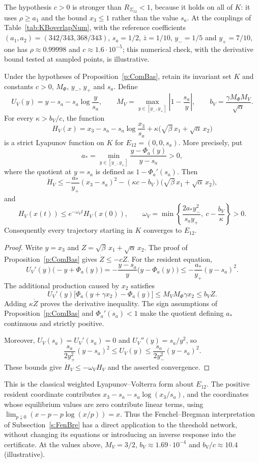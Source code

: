The hypothesis $c>0$ is stronger than $R_{\Sigma_{12}}<1$, because it holds on all of $K$: it uses
$\rho\ge a_1$ and the bound $x_3\le1$ rather than the value $s_a$. At the couplings of
Table~\ref{tab:KBoverlapNum}, with the reference coefficients $(a_1,a_2)=(342/343,368/343)$,
$s_a=1/2$, $\bar z=1/10$, $y_-=1/5$ and $y_+=7/10$, one has $\rho\approx0.99998$ and
$c\approx1.6\cdot10^{-5}$; this numerical check, with the derivative bound tested at sampled points,
is illustrative.

Under the hypotheses of Proposition~\ref{p:ComBas}, retain its invariant set $K$ and constants $c>0$, $M_\Phi$, $y_-$, $y_+$ and $s_a$. Define
\[
 U_V(y)=y-s_a-s_a\log\frac{y}{s_a},\qquad
 M_V=\max_{y\in[y_-,y_+]}\left|1-\frac{s_a}{y}\right|,\qquad
 b_V=\frac{\gamma M_\Phi M_V}{\sqrt{\alpha}}.
\]
For every $\kappa>b_V/c$, the function
\[
 H_V(x)=x_3-s_a-s_a\log\frac{x_3}{s_a}+\kappa\bigl(\sqrt{\beta}\,x_1+\sqrt{\alpha}\,x_2\bigr)
\]
is a strict Lyapunov function on $K$ for $E_{12}=(0,0,s_a)$. More precisely, put
\[
 a_*=\min_{y\in[y_-,y_+]}\frac{y-\Phi_a(y)}{y-s_a}>0,
\]
where the quotient at $y=s_a$ is defined as $1-\Phi_a'(s_a)$. Then
\[
 \dot H_V\le-\frac{a_*}{y_+}(x_3-s_a)^2-(\kappa c-b_V)\bigl(\sqrt{\beta}\,x_1+\sqrt{\alpha}\,x_2\bigr),
\]
and
\[
 H_V(x(t))\le e^{-\omega_Vt}H_V(x(0)),\qquad
 \omega_V=\min\left\{\frac{2a_*y_-^2}{s_ay_+},\ c-\frac{b_V}{\kappa}\right\}>0.
\]
Consequently every trajectory starting in $K$ converges to $E_{12}$.
\eeP
\begin{proof}
Write $y=x_3$ and $Z=\sqrt{\beta}\,x_1+\sqrt{\alpha}\,x_2$. The proof of Proposition~\ref{p:ComBas} gives $\dot Z\le-cZ$. For the resident equation,
\[
 U_V'(y)\bigl(-y+\Phi_a(y)\bigr)=-\frac{y-s_a}{y}\bigl(y-\Phi_a(y)\bigr)\le-\frac{a_*}{y_+}(y-s_a)^2.
\]
The additional production caused by $x_2$ satisfies
\[
 U_V'(y)\bigl[\Phi_a(y+\gamma x_2)-\Phi_a(y)\bigr]\le M_VM_\Phi\gamma x_2\le b_VZ.
\]
Adding $\kappa\dot Z$ proves the derivative inequality. The sign assumptions of Proposition~\ref{p:ComBas} and $\Phi_a'(s_a)<1$ make the quotient defining $a_*$ continuous and strictly positive.

Moreover, $U_V(s_a)=U_V'(s_a)=0$ and $U_V''(y)=s_a/y^2$, so
\[
 \frac{s_a}{2y_+^2}(y-s_a)^2\le U_V(y)\le\frac{s_a}{2y_-^2}(y-s_a)^2.
\]
These bounds give $\dot H_V\le-\omega_VH_V$ and the asserted convergence.
\end{proof}

This is the classical weighted Lyapunov--Volterra form about $E_{12}$. The positive resident coordinate contributes $x_3-s_a-s_a\log(x_3/s_a)$, and the coordinates whose equilibrium values are zero contribute linear terms, using $\lim_{p\downarrow0}(x-p-p\log(x/p))=x$. Thus the Fenchel--Bregman interpretation of Subsection~\ref{s:FenBre} has a direct application to the threshold network, without changing its equations or introducing an inverse response into the certificate. At the values above, $M_V=3/2$, $b_V\approx1.69\cdot10^{-4}$ and $b_V/c\approx10.4$ (illustrative).

